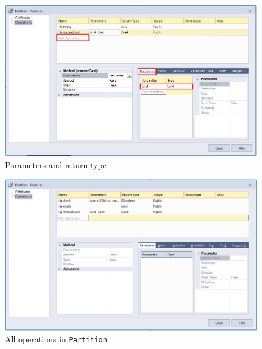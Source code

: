 \begin{stepbystep}
\newpage

\vspace*{1cm}

\begin{figure}[htbp]
	\centering
  \includegraphics[width=\textwidth]{../../org.moflon.doc.handbook.02_leitnersLearningBox/2_staticSemantics/4_creatingMethods/cmVisImages/ea_operationRemoveCard}
	\caption{Parameters and return type}
	\label{ea:operation_parameters}
\end{figure}

\vspace{1cm}

\begin{figure}[h!]
	\centering
  \includegraphics[width=\textwidth]{../../org.moflon.doc.handbook.02_leitnersLearningBox/2_staticSemantics/4_creatingMethods/cmVisImages/ea_operationCheck}
	\caption{All operations in \texttt{Partition}}
	\label{ea:operation_partition}
\end{figure}

\newpage



\end{stepbystep}
